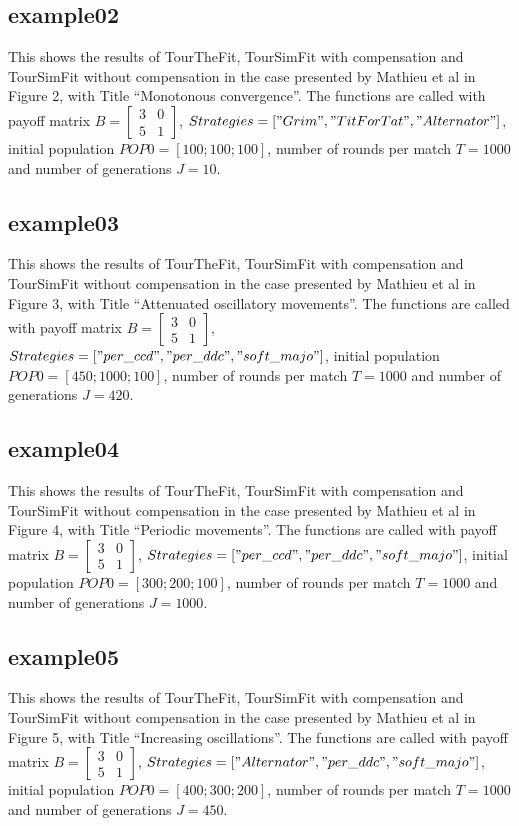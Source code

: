 \subsection{example02}
This shows the results of TourTheFit, TourSimFit with compensation and TourSimFit without compensation in the case presented by Mathieu et al in Figure 2, with Title ``Monotonous convergence''. The functions are called with payoff matrix $B = \begin{bmatrix} 3 & 0 \\ 5 & 1 \end{bmatrix}$, $Strategies = ["Grim", "TitForTat", "Alternator"]$, initial population $POP0 = [100; 100; 100]$, number of rounds per match $T = 1000$ and number of generations $J = 10$.

\subsection{example03}
This shows the results of TourTheFit, TourSimFit with compensation and TourSimFit without compensation in the case presented by Mathieu et al in Figure 3, with Title ``Attenuated oscillatory movements''. The functions are called with payoff matrix $B = \begin{bmatrix} 3 & 0 \\ 5 & 1 \end{bmatrix}$, $Strategies = ["per\_ccd", "per\_ddc", "soft\_majo"]$, initial population $POP0 = [450; 1000; 100]$, number of rounds per match $T = 1000$ and number of generations $J = 420$.

\subsection{example04}
This shows the results of TourTheFit, TourSimFit with compensation and TourSimFit without compensation in the case presented by Mathieu et al in Figure 4, with Title ``Periodic movements''. The functions are called with payoff matrix $B = \begin{bmatrix} 3 & 0 \\ 5 & 1 \end{bmatrix}$, $Strategies = ["per\_ccd", "per\_ddc", "soft\_majo"]$, initial population $POP0 = [300; 200; 100]$, number of rounds per match $T = 1000$ and number of generations $J = 1000$.

\subsection{example05}
This shows the results of TourTheFit, TourSimFit with compensation and TourSimFit without compensation in the case presented by Mathieu et al in Figure 5, with Title ``Increasing oscillations''. The functions are called with payoff matrix $B = \begin{bmatrix} 3 & 0 \\ 5 & 1 \end{bmatrix}$, $Strategies = ["Alternator", "per\_ddc", "soft\_majo"]$, initial population $POP0 = [400; 300; 200]$, number of rounds per match $T = 1000$ and number of generations $J = 450$.

